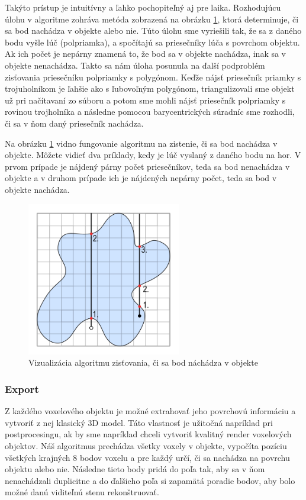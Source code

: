 Takýto prístup je intuitívny a ľahko pochopiteľný aj pre laika. Rozhodujúcu úlohu v algoritme zohráva metóda zobrazená na obrázku \ref{ray}, ktorá determinuje, či sa bod nachádza v objekte alebo nie. Túto úlohu sme vyriešili tak, že sa z daného bodu vyšle lúč (polpriamka), a spočítajú sa priesečníky lúča s povrchom objektu. Ak ich počet je nepárny znamená to, že bod sa v objekte nachádza, inak sa v objekte nenachádza. Takto sa nám úloha posunula na ďalší podproblém zisťovania priesečníku polpriamky s polygónom. Keďže nájsť priesečník priamky s trojuholníkom je ľahšie ako s ľubovoľným polygónom, triangulizovali sme objekt už pri načítavaní zo súboru a potom sme mohli nájsť priesečník polpriamky s rovinou trojholníka a následne pomocou barycentrických súradníc sme rozhodli, či sa v ňom daný priesečník nachádza. 


Na obrázku \ref{ray} vidno fungovanie algoritmu na zistenie, či sa bod nachádza v objekte. Môžete vidieť dva príklady, kedy je lúč vyslaný z daného bodu na hor. V prvom prípade je nájdený párny počet priesečníkov, teda sa bod nenachádza v objekte a v druhom prípade ich je nájdených nepárny počet, teda sa bod v objekte nachádza.
\begin{figure}[h]
	\centering
	\includegraphics[width=0.6\textwidth]{ray.png}
	\caption{Vizualizácia algoritmu zisťovania, či sa bod náchádza v objekte}
	\label{ray}
\end{figure}


\subsubsection{Export}
Z každého voxelového objektu je možné extrahovať jeho povrchovú informáciu a vytvoriť z nej klasický 3D model.
Táto vlastnosť je užitočná napríklad pri postprocesingu, ak by sme napríklad chceli vytvoriť kvalitný render voxelových objektov.
Náš algoritmus prechádza všetky voxely v objekte, vypočíta pozíciu všetkých krajných 8 bodov voxelu a pre každý určí, či sa nachádza na povrchu objektu alebo nie. Následne tieto body pridá do poľa tak, aby sa v ňom nenachádzali duplicitne a do ďalšieho poľa si zapamätá poradie bodov, aby bolo možné danú viditeľnú stenu rekonštruovať.

